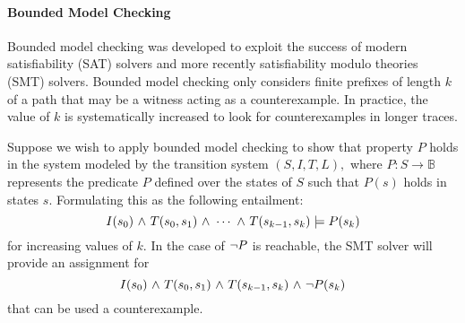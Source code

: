 \paragraph{Bounded Model Checking} Bounded model checking was developed to exploit the success of modern
satisfiability (SAT) solvers and more recently satisfiability modulo
theories (SMT) solvers. Bounded model checking only considers finite
prefixes of length $k$  of a path that may be a witness acting as a
counterexample. In practice, the value of $k$ is systematically
increased to look for counterexamples in longer traces.  

  
Suppose we wish to apply bounded model checking to show that property
$P$ holds in  the system modeled by the transition
system $(S,I,T,L),$ where $P: S \rightarrow \mathbb{B}$ represents
the predicate $P$ defined over the states of $S$ such that $P(s)$
holds in states $s.$
Formulating this as the following entailment:
$$ I(s_0) {\ \wedge \ } T(s_0,s_1) {\ \wedge \ } \cdots {\ \wedge \ } T(s_{k-1},s_k)
\models P(s_k)$$
for increasing values of $k.$ In the case of ${\neg} P$ is reachable,
the SMT solver will provide an assignment for 
$$I(s_0) {\ \wedge \ } T(s_0,s_1) {\ \wedge \ } T(s_{k-1},s_k) {\ \wedge \ } {\neg}
P(s_k)$$
that can be used a counterexample. 

